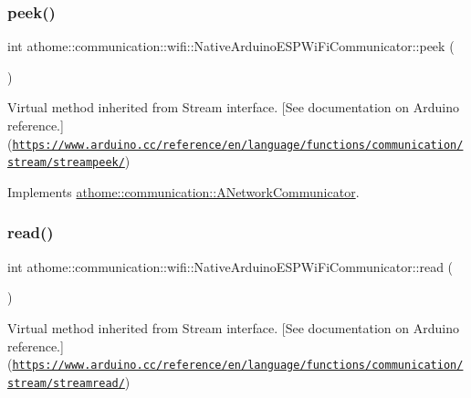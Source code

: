 \subsubsection{\texorpdfstring{peek()}{peek()}}
{\footnotesize\ttfamily int athome\+::communication\+::wifi\+::\+Native\+Arduino\+E\+S\+P\+Wi\+Fi\+Communicator\+::peek (\begin{DoxyParamCaption}{ }\end{DoxyParamCaption})\hspace{0.3cm}{\ttfamily [virtual]}}

Virtual method inherited from Stream interface. \mbox{[}See documentation on Arduino reference.\mbox{]}(\href{https://www.arduino.cc/reference/en/language/functions/communication/stream/streampeek/}{\tt https\+://www.\+arduino.\+cc/reference/en/language/functions/communication/stream/streampeek/}) 

Implements \mbox{\hyperlink{classathome_1_1communication_1_1_a_network_communicator_ad06ecdc94aa77b1bab934b85bed2ac7d}{athome\+::communication\+::\+A\+Network\+Communicator}}.

\mbox{\label{classathome_1_1communication_1_1wifi_1_1_native_arduino_e_s_p_wi_fi_communicator_a07da3b2bf99edad18fb95b6879dbf0f7}} 
\subsubsection{\texorpdfstring{read()}{read()}}
{\footnotesize\ttfamily int athome\+::communication\+::wifi\+::\+Native\+Arduino\+E\+S\+P\+Wi\+Fi\+Communicator\+::read (\begin{DoxyParamCaption}{ }\end{DoxyParamCaption})\hspace{0.3cm}{\ttfamily [virtual]}}

Virtual method inherited from Stream interface. \mbox{[}See documentation on Arduino reference.\mbox{]}(\href{https://www.arduino.cc/reference/en/language/functions/communication/stream/streamread/}{\tt https\+://www.\+arduino.\+cc/reference/en/language/functions/communication/stream/streamread/}) 

